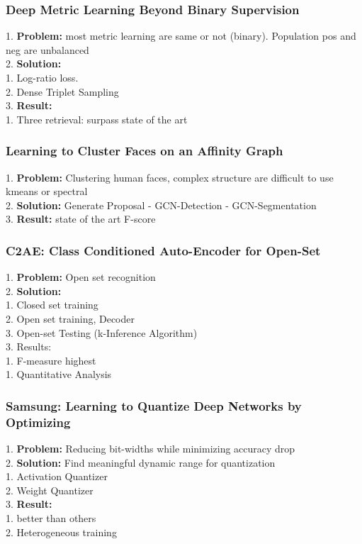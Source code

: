 \subsubsection{Deep Metric Learning Beyond Binary Supervision}
    1. {\bf Problem:} most metric learning are same or not (binary). Population pos and neg are unbalanced \\
    2. {\bf Solution:}  \\
        1. Log-ratio loss. \\
        2. Dense Triplet Sampling \\
    3. {\bf Result:} \\
        1. Three retrieval: surpass state of the art \\
\subsubsection{Learning to Cluster Faces on an Affinity Graph}
    1. {\bf Problem:} Clustering human faces, complex structure are difficult to use kmeans or spectral \\
    2. {\bf Solution:} Generate Proposal - GCN-Detection - GCN-Segmentation \\
    3. {\bf Result:} state of the art F-score \\
\subsubsection{C2AE: Class Conditioned Auto-Encoder for Open-Set}
    1. {\bf Problem:} Open set recognition \\
    2. {\bf Solution:}  \\
        1. Closed set training \\
        2. Open set training, Decoder \\
        3. Open-set Testing (k-Inference Algorithm) \\
    3. Results: \\
        1. F-measure highest \\
            1. Quantitative Analysis \\
\subsubsection{Samsung: Learning to Quantize Deep Networks by Optimizing}
    1. {\bf Problem:} Reducing bit-widths while minimizing accuracy drop \\
    2. {\bf Solution:} Find meaningful dynamic range for quantization \\
        1. Activation Quantizer \\
        2. Weight Quantizer \\
    3. {\bf Result:}  \\
        1. better than others \\
        2. Heterogeneous training \\
